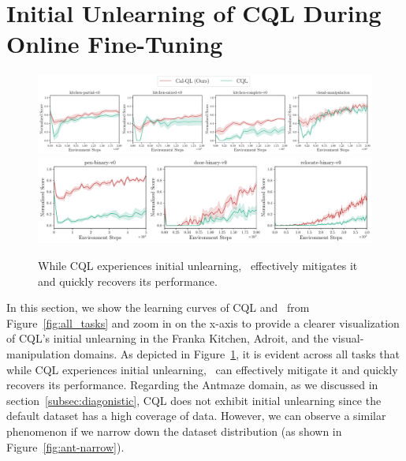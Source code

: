 \vspace{-0.2cm}
\section{Initial Unlearning of CQL During Online Fine-Tuning}
\label{app:cql_dip_zoom_in}
\vspace{-0.2cm}
\begin{figure}[h]
\vspace{-0.5cm}
\begin{center}    
{\includegraphics[clip,width=1.0\linewidth]{chapters/cal_ql/figs-sample/kitchen-cog-zoom-in.pdf}} {\includegraphics[clip,width=0.75\linewidth]{chapters/cal_ql/figs-sample/adroit-zoom-in.pdf}}
\end{center}
\vspace{-0.45cm}
\caption{\label{fig:dip_zoom} \footnotesize{While CQL experiences initial unlearning, \methodname\ effectively mitigates it and quickly recovers its performance.}}
\vspace{-0.4cm}
\end{figure}
In this section, we show the learning curves of CQL and \methodname\ from Figure~\ref{fig:all_tasks} and zoom in on the x-axis to provide a clearer visualization of CQL's initial unlearning in the Franka Kitchen, Adroit, and the visual-manipulation domains. As depicted in Figure~\ref{fig:dip_zoom}, it is evident across all tasks that while CQL experiences initial unlearning, \methodname\ can effectively mitigate it and quickly recovers its performance. Regarding the Antmaze domain, as we discussed in section~\ref{subsec:diagonistic}, CQL does not exhibit initial unlearning since the default dataset has a high coverage of data. However, we can observe a similar phenomenon if we narrow down the dataset distribution (as shown in Figure~\ref{fig:ant-narrow}).




